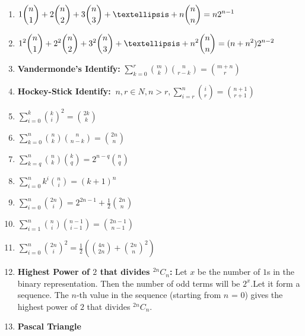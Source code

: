\begin{enumerate}
            \item $\displaystyle \displaystyle1{n \choose 1}+2{n \choose 2}+3{n \choose 3}+…+n{n \choose n}=n2^{n-1}$
            \item $\displaystyle \displaystyle1^2{n \choose 1}+2^2{n \choose 2}+3^2{n \choose 3}+…+n^2{n \choose
                n}=(n+n^2)2^{n-2}$
            \item \textbf{Vandermonde’s Identify:} $\displaystyle \sum \limits_{k=0}^r{m \choose k}{n \choose
                r-k}={m+n
                \choose r}$
            \item \textbf{Hockey-Stick Identify:} $\displaystyle \ n,r \in N, n > r, \sum \limits_{i=r}^n{i
                \choose
                r}={n+1 \choose r+1}$
            \item $\displaystyle \sum \limits_{i=0}^k{k \choose i}^2={2k \choose k}$
            \item $\displaystyle \sum \limits_{k=0}^n{n \choose k}{n \choose n-k}={2n \choose n}$
            \item $\displaystyle \sum \limits_{k=q}^n{n \choose k}{k \choose q}=2^{n-q}{n \choose q}$
            \item $\displaystyle \sum \limits_{i=0}^nk^i{n \choose i}=(k+1)^n$
            \item $\displaystyle \sum \limits_{i=0}^n{2n \choose i}=2^{2n-1}+\frac{1}{2}{2n \choose n}$
            \item $\displaystyle \sum \limits_{i=1}^n{n \choose i}{n-1 \choose i-1}={2n-1 \choose n-1}$
            \item $\displaystyle \sum \limits_{i=0}^n{2n \choose i}^2=\frac{1}{2} \left( {4n \choose 2n}+{2n \choose n}^2
                \right)$
            
            \item \textbf{Highest Power of $\displaystyle 2$ that divides $^{2n}C_n$:}
                Let $\displaystyle x$ be the number of $\displaystyle 1$s in the binary representation. Then the number
                of
                odd
                terms will be $\displaystyle 2^x$.Let it form a sequence. The $n$-th value in the sequence (starting
                from
                $n$ =
                0) gives the highest power of $\displaystyle 2$ that divides $^{2n}C_n$.
            \item \textbf{Pascal Triangle}
                \begin{enumerate}


\end{enumerate}
\end{enumerate}
